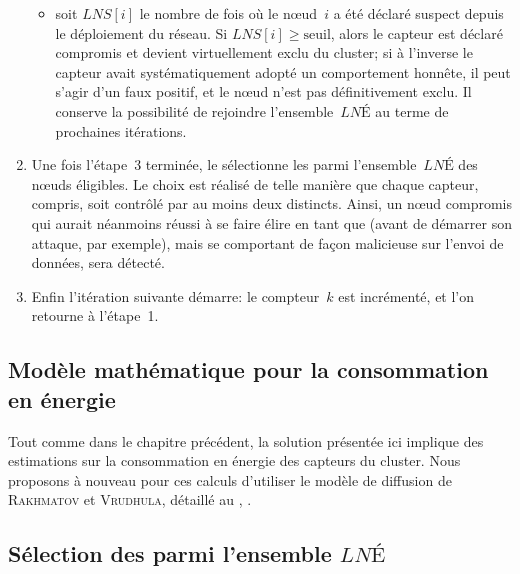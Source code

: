 \begin{enumerate}
\begin{itemize}
            \item soit $\mathit{LNS}[i]$ le nombre de fois où le nœud~$i$ a été déclaré suspect depuis le déploiement du réseau. Si $\mathit{LNS}[i] \ge \mathrm{seuil}$, alors le capteur est déclaré compromis et devient virtuellement exclu du cluster; si à l'inverse le capteur avait systématiquement adopté un comportement honnête, il peut s'agir d'un faux positif, et le nœud n'est pas définitivement exclu. Il conserve la possibilité de rejoindre l'ensemble~$\mathit{LNÉ}$ au terme de prochaines itérations.
        \end{itemize}
    \item Une fois l'étape~3 terminée, le \CH sélectionne les \cns parmi l'ensemble~$\mathit{LNÉ}$ des nœuds éligibles. Le choix est réalisé de telle manière que chaque capteur, \cns compris, soit contrôlé par au moins deux \cns distincts. Ainsi, un nœud compromis qui aurait néanmoins réussi à se faire élire en tant que \cn (avant de démarrer son attaque, par exemple), mais se comportant de façon malicieuse sur l'envoi de données, sera détecté.
    \item Enfin l'itération suivante démarre: le compteur~$k$ est incrémenté, et l'on retourne à l'étape~1.
\end{enumerate}

    \subsection{Modèle mathématique pour la consommation en énergie}

Tout comme dans le chapitre précédent, la solution présentée ici implique des estimations sur la consommation en énergie des capteurs du cluster.
Nous proposons à nouveau pour ces calculs d'utiliser le modèle de diffusion de \textsc{Rakhmatov} et \textsc{Vrudhula}, détaillé au , .

    \subsection{Sélection des \cns parmi l'ensemble $\mathit{LNÉ}$}

